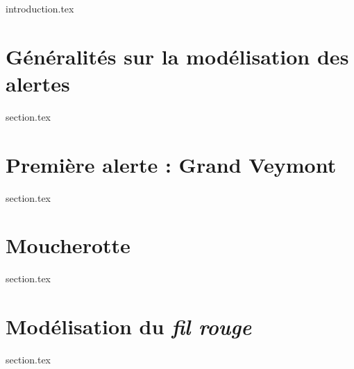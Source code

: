 
\chaptertoc{}

{introduction.tex}

\section{Généralités sur la modélisation des alertes}
\label{sec:9-1}
{section.tex}

\section{Première alerte : Grand Veymont}
\label{sec:9-2}
{section.tex}

\section{Moucherotte}
\label{sec:9-3}
{section.tex}

\section{Modélisation du \emph{fil rouge}}
\label{sec:9-4}
{section.tex}


